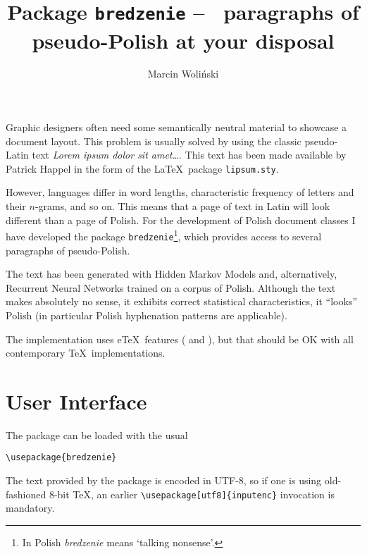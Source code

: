 \documentclass{ltxdoc}
\title{Package \texttt{bredzenie} – \MaxBredzenie\
  paragraphs of pseudo-Polish at your disposal}
\author{Marcin Woliński}
\date{#2, #1}%
\begin{document}
\maketitle

Graphic designers often need some semantically neutral material to
showcase a document layout.  This problem is usually solved by using
the classic pseudo-Latin text \textit{Lorem ipsum dolor sit amet…}.
This text has been made available by Patrick Happel in the form of the
\LaTeX\ package \texttt{lipsum.sty}.

However, languages differ in word lengths, characteristic frequency of
letters and their $n$-grams, and so on.  This means that a page of
text in Latin will look different than a page of Polish.  For the
development of Polish document classes I have developed the package
\texttt{bredzenie}\footnote{In Polish \emph{bredzenie} means ‘talking
  nonsense’.}, which provides access to several paragraphs of
pseudo-Polish.

The text has been generated with Hidden Markov Models and,
alternatively, Recurrent Neural Networks trained on a corpus of
Polish.  Although the text makes absolutely no sense, it exhibits
correct statistical characteristics, it “looks” Polish (in particular
Polish hyphenation patterns are applicable).

The implementation uses e\TeX\ features ( and
), but that should be OK with all contemporary \TeX\
implementations.

\section{User Interface}
\label{sec:interface}

The package can be loaded with the usual
\begin{verbatim}
\usepackage{bredzenie}
\end{verbatim}
The text provided by the package is encoded in UTF-8, so if one is
using old-fashioned 8-bit \TeX, an earlier
\verb|\usepackage[utf8]{inputenc}| invocation is mandatory.
\end{document}
